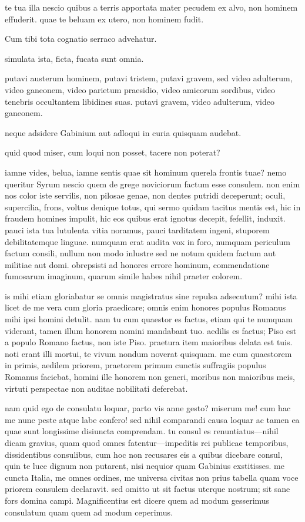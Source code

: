  te tua illa nescio quibus a terris apportata mater pecudem ex alvo, non hominem effuderit. quae te beluam ex utero, non hominem fudit.

 Cum tibi tota cognatio serraco advehatur.

 simulata ista, ficta, fucata sunt omnia.

 putavi austerum hominem, putavi tristem, putavi gravem, sed video adulterum, video ganeonem, video parietum praesidio, video amicorum sordibus, video tenebris occultantem libidines suas. putavi gravem, video adulterum, video ganeonem.

 neque adsidere Gabinium aut adloqui in curia quisquam audebat.

 quid quod miser, cum loqui non posset, tacere non poterat?

 iamne vides, belua, iamne sentis quae sit hominum querela frontis tuae? nemo queritur Syrum nescio quem de grege noviciorum factum esse consulem. non enim nos color iste servilis, non pilosae genae, non dentes putridi deceperunt; oculi, supercilia, frons, voltus denique totus, qui sermo quidam tacitus mentis est, hic in fraudem homines impulit, hic eos quibus erat ignotus decepit, fefellit, induxit. pauci ista tua lutulenta vitia noramus, pauci tarditatem ingeni, stuporem debilitatemque linguae. numquam erat audita vox in foro, numquam periculum factum consili, nullum non modo inlustre sed ne notum quidem factum aut militiae aut domi. obrepsisti ad honores errore hominum, commendatione fumosarum imaginum, quarum simile habes nihil praeter colorem.

 is mihi etiam gloriabatur se omnis magistratus sine repulsa adsecutum? mihi ista licet de me vera cum gloria praedicare; omnis enim honores populus Romanus mihi ipsi homini detulit. nam tu cum quaestor es factus, etiam qui te numquam viderant, tamen illum honorem nomini mandabant tuo. aedilis es factus; Piso est a populo Romano factus, non iste Piso. praetura item maioribus delata est tuis. noti erant illi mortui, te vivum nondum noverat quisquam. me cum quaestorem in primis, aedilem priorem, praetorem primum cunctis suffragiis populus Romanus faciebat, homini ille honorem non generi, moribus non maioribus meis, virtuti perspectae non auditae nobilitati deferebat.

 nam quid ego de consulatu loquar, parto vis anne gesto? miserum me! cum hac me nunc peste atque labe confero! sed nihil comparandi causa loquar ac tamen ea quae sunt longissime disiuncta comprendam. tu consul es renuntiatus—nihil dicam gravius, quam quod omnes fatentur—impeditis rei publicae temporibus, dissidentibus consulibus, cum hoc non recusares eis a quibus dicebare consul, quin te luce dignum non putarent, nisi nequior quam Gabinius exstitisses. me cuncta Italia, me omnes ordines, me universa civitas non prius tabella quam voce priorem consulem declaravit. sed omitto ut sit factus uterque nostrum; sit sane fors domina campi. Magnificentius est dicere quem ad modum gesserimus consulatum quam quem ad modum ceperimus.

